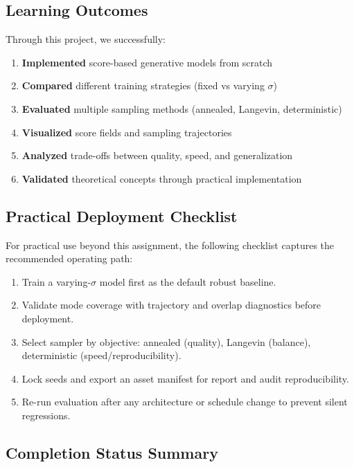 \documentclass[journal]{IEEEtran}
\begin{document}
\subsection{Learning Outcomes}

Through this project, we successfully:

\begin{enumerate}
    \item \textbf{Implemented} score-based generative models from scratch
    \item \textbf{Compared} different training strategies (fixed vs varying $\sigma$)
    \item \textbf{Evaluated} multiple sampling methods (annealed, Langevin, deterministic)
    \item \textbf{Visualized} score fields and sampling trajectories
    \item \textbf{Analyzed} trade-offs between quality, speed, and generalization
    \item \textbf{Validated} theoretical concepts through practical implementation
\end{enumerate}

\subsection{Practical Deployment Checklist}

For practical use beyond this assignment, the following checklist captures the recommended operating path:
\begin{enumerate}
    \item Train a varying-$\sigma$ model first as the default robust baseline.
    \item Validate mode coverage with trajectory and overlap diagnostics before deployment.
    \item Select sampler by objective: annealed (quality), Langevin (balance), deterministic (speed/reproducibility).
    \item Lock seeds and export an asset manifest for report and audit reproducibility.
    \item Re-run evaluation after any architecture or schedule change to prevent silent regressions.
\end{enumerate}

\subsection{Completion Status Summary}
\end{document}
